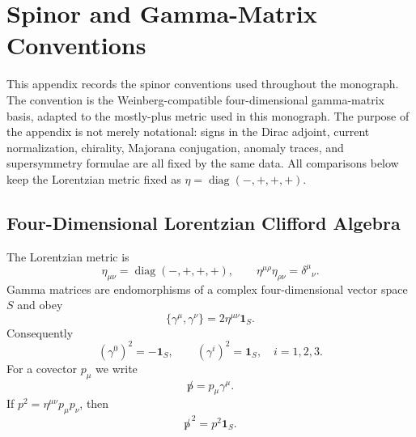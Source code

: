 \chapter{Spinor and Gamma-Matrix Conventions}
\label{app:spinor-conventions}

This appendix records the spinor conventions used throughout the monograph.
The convention is the Weinberg-compatible four-dimensional gamma-matrix
basis, adapted to the mostly-plus metric used in this monograph.  The purpose
of the appendix is not merely notational: signs in the Dirac adjoint, current
normalization, chirality, Majorana conjugation, anomaly traces, and
supersymmetry formulae are all fixed by the same data.  All comparisons below
keep the Lorentzian metric fixed as \(\eta=\operatorname{diag}(-,+,+,+)\).

\section{Four-Dimensional Lorentzian Clifford Algebra}

The Lorentzian metric is
\[
  \eta_{\mu\nu}=\operatorname{diag}(-,+,+,+),
  \qquad
  \eta^{\mu\rho}\eta_{\rho\nu}=\delta^\mu{}_\nu .
\]
Gamma matrices are endomorphisms of a complex four-dimensional vector space
\(S\) and obey
\begin{equation}
  \{\gamma^\mu,\gamma^\nu\}=2\eta^{\mu\nu}\mathbf 1_S .
  \label{eq:appendix-lorentz-clifford}
\end{equation}
Consequently
\[
  (\gamma^0)^2=-\mathbf 1_S,
  \qquad
  (\gamma^i)^2=\mathbf 1_S,\quad i=1,2,3 .
\]
For a covector \(p_\mu\) we write
\[
  \not p=p_\mu\gamma^\mu .
\]
If \(p^2=\eta^{\mu\nu}p_\mu p_\nu\), then
\[
  \not p^{\,2}=p^2\mathbf 1_S .
\]

